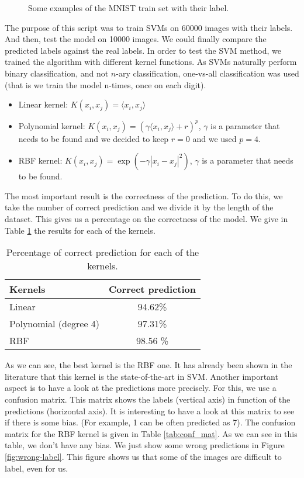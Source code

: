 \documentclass[a4paper, 11pt]{article}
\begin{document}
\begin{figure}[H]
\centering

\caption{\label{fig:train-set} Some examples of the MNIST train set with their label.}
\end{figure}

The purpose of this script was to train SVMs on 60000 images with their
labels. And then, test the model on 10000 images. We could finally compare the
predicted labels against the real labels. In order to test the SVM method, we
trained the algorithm with different kernel functions. As SVMs naturally perform
binary classification, and not $n$-ary classification, one-vs-all classification
was used (that is we train the model n-times, once on each digit).
\newpage
\begin{itemize}
\item Linear kernel: $K(x_i,x_j) = \langle x_i, x_j \rangle$
\item Polynomial kernel: $K(x_i,x_j) = (\gamma \langle x_i, x_j \rangle + r)^p$, $\gamma$ is a parameter that needs to be found and we decided to keep $r=0$ and we used $p=4$.
\item RBF kernel:  $K(x_i,x_j) = \exp(-\gamma|x_i-x_j|^2)$, $\gamma$ is a parameter that needs to be found.
\end{itemize} 

The most important result is the correctness of the prediction. To do this, we
take the number of correct prediction and we divide it by the length of the
dataset. This gives us a percentage on the correctness of the model. We give in
Table \ref{tab:correct} the results for each of the kernels.

\begin{table}[H]
\centering
\begin{tabular}{l|c}
Kernels & Correct prediction \\
\hline
Linear & 94.62\% \\
Polynomial (degree 4) & 97.31\% \\ 
RBF & 98.56 \% \\ 
\end{tabular}
\caption{\label{tab:correct} Percentage of correct prediction for each of the kernels.}
\end{table}

As we can see, the best kernel is the RBF one. It has already been shown in the
literature that this kernel is the state-of-the-art in SVM. Another important
aspect is to have a look at the predictions more precisely. For this, we use a
confusion matrix. This matrix shows the labels (vertical axis) in function of
the predictions (horizontal axis). It is interesting to have a look at this
matrix to see if there is some bias. (For example, 1 can be often predicted as
7). The confusion matrix for the RBF kernel is given in Table
\ref{tab:conf_mat}. As we can see in this table, we don't have any bias. We
just show some wrong predictions in Figure \ref{fig:wrong-label}. This figure
shows us that some of the images are difficult to label, even for us.
\end{document}
